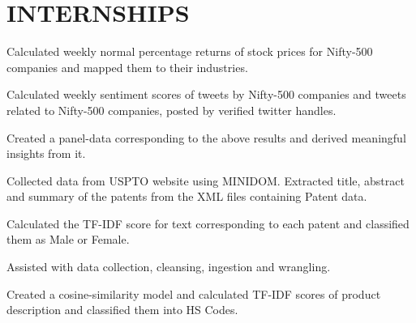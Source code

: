 \documentclass[]{deedy-resume-openfont}
\begin{document}
\hfill
\begin{minipage}[t]{0.66\textwidth} 



\section{INTERNSHIPS}

\vspace{\topsep} %

\vspace{\topsep} %
\begin{tightemize}
\item Calculated weekly normal percentage returns of stock prices for Nifty-500 companies and mapped them to their industries.
\item Calculated weekly sentiment scores of tweets by Nifty-500 companies and tweets related to Nifty-500 companies, posted by verified twitter handles.
\item Created a panel-data corresponding to the above results and derived meaningful insights from it. 
\end{tightemize}
\vspace{\topsep} %
\begin{tightemize}
\item Collected data from USPTO website using MINIDOM. Extracted title, abstract and summary of the patents from the XML files containing Patent data.
\item Calculated the TF-IDF score for text corresponding to each patent and classified them as Male or Female.
\end{tightemize}
\vspace{\topsep} %

\begin{tightemize}
\item Assisted with data collection, cleansing, ingestion and wrangling. 
\item Created a cosine-similarity model and calculated TF-IDF scores of product description and classified them into HS Codes.
\end{tightemize}


\end{minipage}
\end{document}
